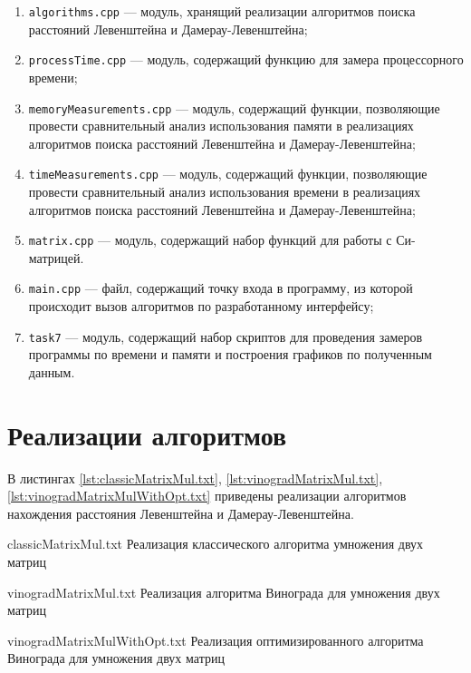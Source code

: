 \begin{enumerate}[label={\arabic*)}]
	\item \texttt{algorithms.cpp} --- модуль, хранящий реализации алгоритмов поиска расстояний Левенштейна и Дамерау-Левенштейна;
	\item \texttt{processTime.cpp} --- модуль, содержащий функцию для замера процессорного времени;
	\item \texttt{memoryMeasurements.cpp} --- модуль, содержащий функции, позволяющие провести сравнительный анализ использования памяти в реализациях алгоритмов поиска расстояний Левенштейна и Дамерау-Левенштейна;
	\item \texttt{timeMeasurements.cpp} --- модуль, содержащий функции, позволяющие провести сравнительный анализ использования времени в реализациях алгоритмов поиска расстояний Левенштейна и Дамерау-Левенштейна;
	\item \texttt{matrix.cpp} --- модуль, содержащий набор функций для работы с Си-матрицей.
	
	\item \texttt{main.cpp} --- файл, содержащий точку входа в программу, из которой происходит вызов алгоритмов по разработанному интерфейсу;
	\item \texttt{task7} --- модуль, содержащий набор скриптов для проведения замеров программы по времени и памяти и построения графиков по полученным данным.
\end{enumerate}

\section{Реализации алгоритмов}


В листингах \ref{lst:classicMatrixMul.txt}, \ref{lst:vinogradMatrixMul.txt}, \ref{lst:vinogradMatrixMulWithOpt.txt} приведены реализации алгоритмов нахождения расстояния Левенштейна и Дамерау-Левенштейна.

{classicMatrixMul.txt} %
{Реализация классического алгоритма умножения двух матриц} %

\clearpage

{vinogradMatrixMul.txt} %
{Реализация алгоритма Винограда для умножения двух матриц} %

\clearpage

{vinogradMatrixMulWithOpt.txt} %
{Реализация оптимизированного алгоритма Винограда для умножения двух матриц} %

